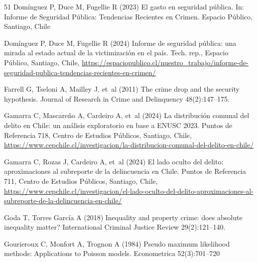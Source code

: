 \documentclass[pdflatex,sn-basic]{sn-jnl}
\begin{document}
\begin{thebibliography}{51}
Dom\'inguez P, Duce M, Fugellie R (2023) El gasto en seguridad p\'ublica. In:
  Informe de Seguridad P\'ublica: Tendencias Recientes en Crimen. Espacio
  P\'ublico, Santiago, Chile

Dom\'inguez P, Duce M, Fugellie R (2024) Informe de seguridad p\'ublica: una
  mirada al estado actual de la victimizaci\'on en el pa\'is. Tech. rep.,
  Espacio P\'ublico, Santiago, Chile,
  \urlprefix\url{https://espaciopublico.cl/nuestro_trabajo/informe-de-seguridad-publica-tendencias-recientes-en-crimen/}

Farrell G, Tseloni A, Mailley J, et~al (2011) The crime drop and the security
  hypothesis. Journal of Research in Crime and Delinquency 48(2):147--175.

Gamarra C, Mascare\~no A, Cardeiro A, et~al (2024{}) La
  distribuci\'on comunal del delito en {Chile}: un an\'alisis exploratorio en
  base a {ENUSC} 2023. Puntos de Referencia 718, Centro de Estudios P\'ublicos,
  Santiago, Chile,
  \urlprefix\url{https://www.cepchile.cl/investigacion/la-distribucion-comunal-del-delito-en-chile/}

Gamarra C, Rozas J, Cardeiro A, et~al (2024{}) El lado oculto del
  delito: aproximaciones al subreporte de la delincuencia en {Chile}. Puntos de
  Referencia 711, Centro de Estudios P\'ublicos, Santiago, Chile,
  \urlprefix\url{https://www.cepchile.cl/investigacion/el-lado-oculto-del-delito-aproximaciones-al-subreporte-de-la-delincuencia-en-chile/}

Goda T, {Torres Garc\'ia} A (2018) Inequality and property crime: does absolute
  inequality matter? International Criminal Justice Review 29(2):121--140.

Gourieroux C, Monfort A, Trognon A (1984) Pseudo maximum likelihood methods:
  {A}pplications to {P}oisson models. Econometrica 52(3):701--720


\end{thebibliography}
\end{document}
